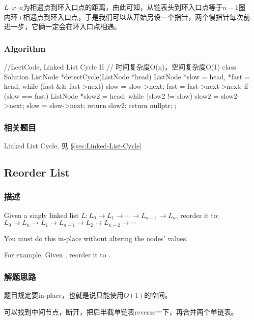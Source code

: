 $L – x – 
a$为相遇点到环入口点的距离，由此可知，从链表头到环入口点等于$n-1$圈内环+相遇点到环入口点，于是我们可以从开始另设一个指针，两个慢指针每次前进一步，它俩一定会在环入口点相遇。

\subsubsection{Algorithm}
\begin{Code}
	//LeetCode, Linked List Cycle II
	// 时间复杂度O(n)，空间复杂度O(1)
	class Solution {
		ListNode *detectCycle(ListNode *head) {
			ListNode *slow = head, *fast = head;
			while (fast && fast->next) {
				slow = slow->next;
				fast = fast->next->next;
				if (slow == fast) {
					ListNode *slow2 = head;
					while (slow2 != slow) {
						slow2 = slow2->next;
						slow = slow->next;
					}
					return slow2;
				}
			}
			return nullptr;
		}
	};
\end{Code}


\subsubsection{相关题目}
\begindot
\item Linked List Cycle, 见 \S \ref{sec:Linked-List-Cycle}
\myenddot


\subsection{Reorder List}
\label{sec:Reorder-List}


\subsubsection{描述}
Given a singly linked list $L: L_0 \rightarrow L_1 \rightarrow \cdots 
\rightarrow L_{n-1} \rightarrow L_n$,
reorder it to: $L_0 \rightarrow L_n \rightarrow L_1 \rightarrow L_{n-1} 
\rightarrow L_2 \rightarrow L_{n-2} \rightarrow \cdots$

You must do this in-place without altering the nodes' values.

For example,
Given , reorder it to .


\subsubsection{解题思路}
题目规定要in-place，也就是说只能使用$O(1)$的空间。

可以找到中间节点，断开，把后半截单链表reverse一下，再合并两个单链表。


